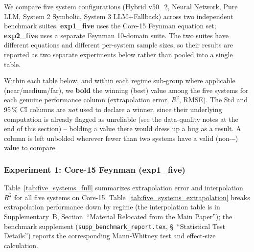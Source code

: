 \documentclass[twoside,11pt]{article}
\begin{document}
We compare five system configurations (Hybrid v50\_2, Neural Network, Pure
LLM, System 2 Symbolic, System 3 LLM+Fallback) across two independent
benchmark suites. \textbf{exp1\_five} uses the Core-15 Feynman equation set;
\textbf{exp2\_five} uses a separate Feynman 10-domain suite. The two suites
have different equations and different per-system sample sizes, so their
results are reported as two separate experiments below rather than pooled
into a single table.

Within each table below, and within each regime sub-group where applicable
(near/medium/far), we \textbf{bold} the winning (best) value among the five
systems for each genuine performance column (extrapolation error, $R^2$,
RMSE). The Std and 95\,\% CI columns are \emph{not} used to declare a winner,
since their underlying computation is already flagged as unreliable (see the
data-quality notes at the end of this section) -- bolding a value there would
dress up a bug as a result. A column is left unbolded wherever fewer than two
systems have a valid (non-\texttt{---}) value to compare.

\subsubsection{Experiment 1: Core-15 Feynman (exp1\_five)}\label{subsubsec:five-system-exp1}

Table~\ref{tab:five_systems_full} summarizes extrapolation error
and interpolation $R^2$ for all five systems on Core-15. Table~\ref{tab:five_systems_extrapolation} breaks extrapolation
performance down by regime (the interpolation table is in Supplementary~B, Section~``Material Relocated from the Main Paper''); the benchmark supplement
(\texttt{supp\_benchmark\_report.tex}, \S~``Statistical Test Details'') reports
the corresponding Mann-Whitney test and effect-size calculation.
\end{document}
